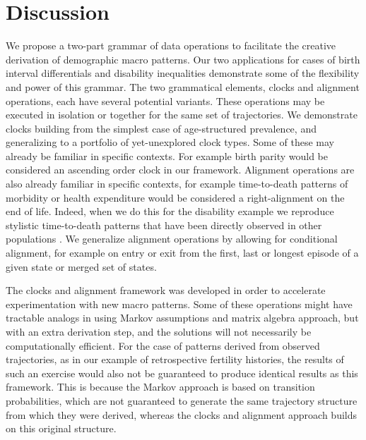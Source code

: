 \documentclass{article}
\begin{document}
\section{Discussion}

We propose a two-part grammar of data operations to facilitate the creative derivation of demographic macro patterns. Our two applications for cases of birth interval differentials and disability inequalities demonstrate some of the flexibility and power of this grammar. The two grammatical elements, clocks and alignment operations, each have several potential variants. These operations may be executed in isolation or together for the same set of trajectories. We demonstrate clocks building from the simplest case of age-structured prevalence, and generalizing to a portfolio of yet-unexplored clock types. Some of these may already be familiar in specific contexts. For example birth parity would be considered an ascending order clock in our framework. Alignment operations are also already familiar in specific contexts, for example time-to-death patterns of morbidity or health expenditure would be considered a right-alignment on the end of life. Indeed, when we do this for the disability example we reproduce stylistic time-to-death patterns that have been directly observed in other populations \citep{klijs2010disability, riffe2016time}. We generalize alignment operations by allowing for conditional alignment, for example on entry or exit from the first, last or longest episode of a given state or merged set of states.

The clocks and alignment framework was developed in order to accelerate experimentation with new macro patterns. Some of these operations might have tractable analogs in using Markov assumptions and matrix algebra approach, but with an extra derivation step, and the solutions will not necessarily be computationally efficient. For the case of patterns derived from observed trajectories, as in our example of retrospective fertility histories, the results of such an exercise would also not be guaranteed to produce identical results as this framework. This is because the Markov approach is based on transition probabilities, which are not guaranteed to generate the same trajectory structure from which they were derived, whereas the clocks and alignment approach builds on this original structure. 
\end{document}

